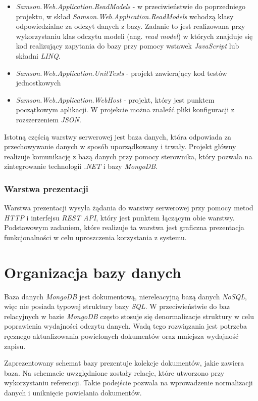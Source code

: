 \documentclass[a4paper,twoside,12pt]{book}
\newcommand{\obcy}[1]{\emph{#1}}
\newcommand{\ang}[1]{{\selectlanguage{british}\obcy{#1}}}
\begin{document}
\begin{itemize}
	\item \textit{Samson.Web.Application.ReadModels} - w przeciwieństwie do poprzedniego projektu, w skład \textit{Samson.Web.Application.ReadModels} wchodzą klasy odpowiedzialne za odczyt danych z bazy. Zadanie to jest realizowana przy wykorzystaniu klas odczytu modeli (ang. \ang{read model}) w których znajduje się kod realizujący zapytania do bazy przy pomocy wstawek \textit{JavaScript} lub składni \textit{LINQ}.
	\item \textit{Samson.Web.Application.UnitTests} - projekt zawierający kod testów jednostkowych
	\item \textit{Samson.Web.Application.WebHost} - projekt, który jest punktem początkowym aplikacji. W projekcie można znaleźć pliki konfiguracji z rozszerzeniem \textit{JSON}.
\end{itemize}
Istotną częścią warstwy serwerowej jest baza danych, która odpowiada za przechowywanie danych w sposób uporządkowany i trwały. Projekt główny realizuje komunikację z bazą danych przy pomocy sterownika, który pozwala na zintegrowanie technologii \textit{.NET} i bazy \textit{MongoDB}.

\subsubsection{Warstwa prezentacji}
Warstwa prezentacji wysyła żądania do warstwy serwerowej przy pomocy metod \textit{HTTP} i interfejsu \textit{REST API}, który jest punktem łączącym obie warstwy. Podstawowym zadaniem, które realizuje ta warstwa jest graficzna prezentacja funkcjonalności w celu uproszczenia korzystania z systemu.

\section{Organizacja bazy danych}
Baza danych \textit{MongoDB} jest dokumentową, niereleacyjną bazą danych \textit{NoSQL}, więc nie posiada typowej struktury bazy \textit{SQL}. W przeciwieństwie do baz relacyjnych w bazie \textit{MongoDB} często stosuje się denormalizacje struktury w celu poprawienia wydajności odczytu danych. Wadą tego rozwiązania jest potrzeba ręcznego aktualizowania powielonych dokumentów oraz mniejsza wydajność zapisu.

Zaprezentowany schemat bazy prezentuje kolekcje dokumentów, jakie zawiera baza. Na schemacie uwzględnione zostały relacje, które utworzono przy wykorzystaniu referencji. Takie podejście pozwala na wprowadzenie normalizacji danych i uniknięcie powielania dokumentów\cite{bib:mongoRelations}.
\end{document}

